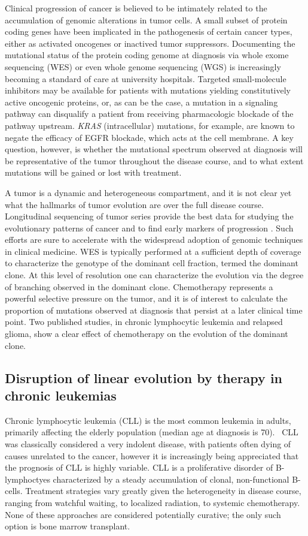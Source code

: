 \documentclass[a4paper,11pt]{article}
\begin{document}
Clinical progression of cancer is believed to be intimately related to the accumulation of genomic alterations in tumor cells.
A small subset of protein coding genes have been implicated in the pathogenesis of certain cancer types, either as activated oncogenes or inactived tumor suppressors.
Documenting the mutational status of the protein coding genome at diagnosis via whole exome sequencing (WES) or even whole genome sequencing (WGS) is increasingly becoming a standard of care at university hospitals.
Targeted small-molecule inhibitors may be available for patients with mutations yielding constitutively active oncogenic proteins, or, as can be the case, a mutation in a signaling pathway can disqualify a patient from receiving pharmacologic blockade of the pathway upstream.
\textit{KRAS} (intracellular) mutations, for example, are known to negate the efficacy of EGFR blockade, which acts at the cell membrane.
A key question, however, is whether the mutational spectrum observed at diagnosis will be representative of the tumor throughout the disease course, and to what extent mutations will be gained or lost with treatment.

A tumor is a dynamic and heterogeneous compartment, and it is not clear yet what the hallmarks of tumor evolution are over the full disease course.
Longitudinal sequencing of tumor series provide the best data for studying the evolutionary patterns of cancer \cite{wang2015tumor} and to find early markers of progression \cite{rossi2014clinical}.
Such efforts are sure to accelerate with the widespread adoption of genomic techniques in clinical medicine.
WES is typically performed at a sufficient depth of coverage to characterize the genotype of the dominant cell fraction, termed the dominant clone.
At this level of resolution one can characterize the evolution via the degree of branching observed in the dominant clone.
Chemotherapy represents a powerful selective pressure on the tumor, and it is of interest to calculate the proportion of mutations observed at diagnosis that persist at a later clinical time point.
Two published studies, in chronic lymphocytic leukemia and relapsed glioma, show a clear effect of chemotherapy on the evolution of the dominant clone.

\subsection{Disruption of linear evolution by therapy in chronic leukemias}

Chronic lymphocytic leukemia (CLL) is the most common leukemia in adults, primarily affecting the elderly population (median age at diagnosis is 70).~\cite{smith2011incidence}
CLL was classically considered a very indolent disease, with patients often dying of causes unrelated to the cancer, however it is increasingly being appreciated that the prognosis of CLL is highly variable.
CLL is a proliferative disorder of B-lymphoctyes characterized by a steady accumulation of clonal, non-functional B-cells.
Treatment strategies vary greatly given the heterogeneity in disease course, ranging from watchful waiting, to localized radiation, to systemic chemotherapy.
None of these approaches are considered potentially curative; the only such option is bone marrow transplant.
\end{document}
